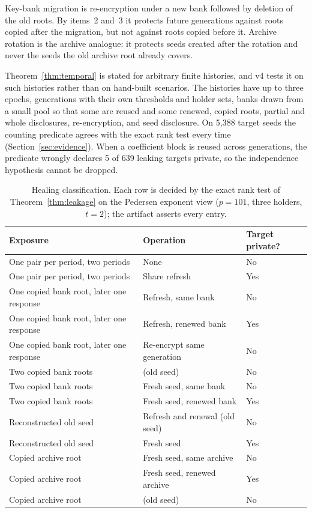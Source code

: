 \documentclass[pdflatex,sn-mathphys-num]{sn-jnl}
\theoremstyle{plain}
\theoremstyle{definition}
\begin{document}
Key-bank migration is re-encryption under a new bank followed by deletion of the old roots. By items~2 and~3 it protects future generations against roots copied after the migration, but not against roots copied before it. Archive rotation is the archive analogue: it protects seeds created after the rotation and never the seeds the old archive root already covers.

Theorem~\ref{thm:temporal} is stated for arbitrary finite histories, and v4 tests it on such histories rather than on hand-built scenarios. The histories have up to three epochs, generations with their own thresholds and holder sets, banks drawn from a small pool so that some are reused and some renewed, copied roots, partial and whole disclosures, re-encryption, and seed disclosure. On 5,388 target seeds the counting predicate agrees with the exact rank test every time (Section~\ref{sec:evidence}). When a coefficient block is reused across generations, the predicate wrongly declares 5 of 639 leaking targets private, so the independence hypothesis cannot be dropped.

\begin{table}[htbp]
\caption{Healing classification. Each row is decided by the exact rank test of Theorem~\ref{thm:leakage} on the Pedersen exponent view ($p=101$, three holders, $t=2$); the artifact asserts every entry.}\label{tab:healing}
\centering\footnotesize
\begin{tabularx}{\linewidth}{@{}p{.40\linewidth}p{.36\linewidth}Y@{}}\toprule
Exposure & Operation & Target private?\\\midrule
One pair per period, two periods & None & No\\
One pair per period, two periods & Share refresh & Yes\\
One copied bank root, later one response & Refresh, same bank & No\\
One copied bank root, later one response & Refresh, renewed bank & Yes\\
One copied bank root, later one response & Re-encrypt same generation & No\\
Two copied bank roots & (old seed) & No\\
Two copied bank roots & Fresh seed, same bank & No\\
Two copied bank roots & Fresh seed, renewed bank & Yes\\
Reconstructed old seed & Refresh and renewal (old seed) & No\\
Reconstructed old seed & Fresh seed & Yes\\
Copied archive root & Fresh seed, same archive & No\\
Copied archive root & Fresh seed, renewed archive & Yes\\
Copied archive root & (old seed) & No\\\bottomrule
\end{tabularx}
\end{table}
\end{document}
